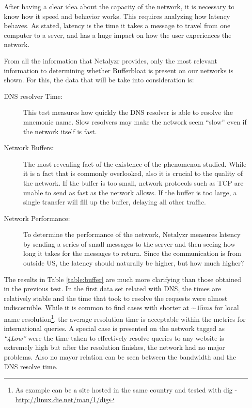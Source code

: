 After having a clear idea about the capacity of the network, it is necessary
to know how it speed and behavior works. This requires analyzing how
latency behaves. As stated, latency is the time it takes a message to travel
from one computer to a sever, and has a huge impact on how the user experiences
the network.

From all the information that Netalyzr provides, only
the most relevant information to determining whether Bufferbloat is present
on our networks is shown. For this, the data that will be take into consideration is:

\begin{description}

\item [DNS resolver Time:] This test measures how quickly the DNS
resolver is able to resolve the mnemonic name. Slow resolvers may make the
network seem ``slow'' even if the network itself is fast.

\item [Network Buffers:] The most revealing fact of the existence of the
phenomenon studied. While it is a fact that is commonly overlooked, also it is
crucial to the quality of the network. If the buffer is too small, network
protocols such as TCP are unable to send as fast as the network allows. If the
buffer is too large, a single transfer will fill up the buffer, delaying all
other traffic.

\item [Network Performance:] To determine the performance of the network,
Netalyzr measures latency by sending a series of small messages to the server
and then seeing how long it takes for the messages to return. Since the
communication is from outside US, the latency should naturally be higher, but
how much higher?
\end{description}


The results in Table \ref{table:buffer} are much more clarifying than those
obtained in the previous test. In the first data set related with DNS, the
times are relatively stable and the time that took to resolve the requests
were almost indiscernible. While it is common to find cases with shorter at
$\sim15ms$ for local name resolution\footnote{ As example can be a site hosted
in the same country and tested with dig -
\url{http://linux.die.net/man/1/dig}}, the average resolution time is
acceptable within the metrics for international queries. A special case is
presented on the network tagged as \emph{``4Low''} were the time taken
to effectively resolve queries to any website is extremely high but after
the resolution finishes, the network had no major problems. Also no mayor relation can be seen between the bandwidth and the
DNS resolve time.

